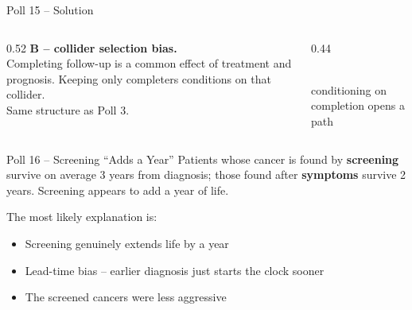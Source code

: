 \documentclass[aspectratio=169]{beamer}
\begin{document}
\begin{frame}{Poll 15 \;--\; Solution}
  \small
  \begin{columns}[T]
    \begin{column}{0.52\textwidth}
      \textcolor{good}{\textbf{B -- collider selection bias.}}\\[0.4em]
      Completing follow-up is a common effect of treatment and prognosis.
      Keeping only completers conditions on that collider.\\[0.3em]
      \textcolor{brick}{Same structure as Poll 3.}
    \end{column}
    \begin{column}{0.44\textwidth}
      \centering
      \\[0.3em]
      {\scriptsize conditioning on completion opens a path}
    \end{column}
  \end{columns}
\end{frame}

\begin{frame}{Poll 16 \;--\; Screening ``Adds a Year''}
  \small
  Patients whose cancer is found by \textbf{screening} survive on average 3
  years from diagnosis; those found after \textbf{symptoms} survive 2 years.
  Screening appears to add a year of life.
  \vspace{0.8em}

  The most likely explanation is:
  \begin{itemize}
    \item[\textbf{A.}] Screening genuinely extends life by a year
    \item[\textbf{B.}] Lead-time bias -- earlier diagnosis just starts the clock sooner
    \item[\textbf{C.}] The screened cancers were less aggressive
  \end{itemize}
\end{frame}
\end{document}
